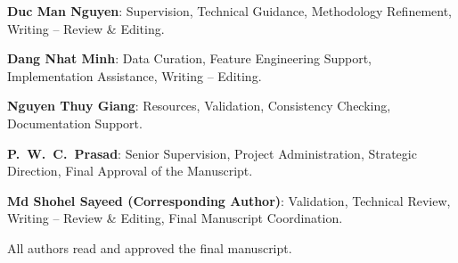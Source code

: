 \documentclass{ieeeaccess}
\begin{document}
\textbf{Duc Man Nguyen}: Supervision, Technical Guidance, Methodology Refinement,
Writing – Review \& Editing.

\textbf{Dang Nhat Minh}: Data Curation, Feature Engineering Support, Implementation Assistance,
Writing – Editing.

\textbf{Nguyen Thuy Giang}: Resources, Validation, Consistency Checking, Documentation Support.

\textbf{P.~W.~C.~Prasad}: Senior Supervision, Project Administration, Strategic Direction,
Final Approval of the Manuscript.

\textbf{Md Shohel Sayeed (Corresponding Author)}: Validation, Technical Review, Writing – Review \& Editing, 
Final Manuscript Coordination.

All authors read and approved the final manuscript.



\end{document}
